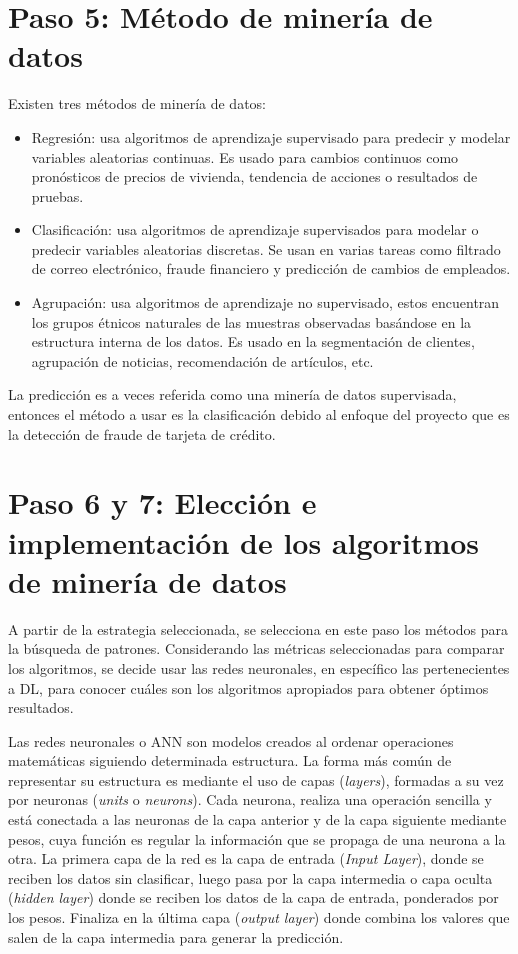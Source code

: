 \section{Paso 5: M\'{e}todo de miner\'{i}a de datos}

  Existen tres m\'{e}todos de miner\'{i}a de datos:
  \begin{itemize}
  	\item Regresi\'{o}n: usa algoritmos de aprendizaje supervisado para predecir y modelar variables aleatorias continuas. Es usado para cambios continuos como pron\'{o}sticos de precios de vivienda, tendencia de acciones o resultados de pruebas.
  	\item Clasificaci\'{o}n: usa algoritmos de aprendizaje supervisados para modelar o predecir variables aleatorias discretas. Se usan en varias tareas como filtrado de correo electr\'{o}nico, fraude financiero y predicci\'{o}n de cambios de empleados.
  	\item Agrupaci\'{o}n: usa algoritmos de aprendizaje no supervisado, estos encuentran los grupos \'{e}tnicos naturales de las muestras observadas bas\'{a}ndose en la estructura interna de los datos. Es usado en la segmentaci\'{o}n de clientes, agrupaci\'{o}n de noticias, recomendaci\'{o}n de art\'{i}culos, etc.
  \end{itemize}

  La predicci\'{o}n es a veces referida como una miner\'{i}a de datos supervisada, entonces el m\'{e}todo a usar es la clasificaci\'{o}n debido al enfoque del proyecto que es la detecci\'{o}n de fraude de tarjeta de cr\'{e}dito.
  
  \section{Paso 6 y 7: Elecci\'{o}n e implementaci\'{o}n de los algoritmos de miner\'{i}a de datos}
  
    A partir de la estrategia seleccionada, se selecciona en este paso los m\'{e}todos para la b\'{u}squeda de patrones. Considerando las m\'{e}tricas seleccionadas para comparar los algoritmos, se decide usar las redes neuronales, en espec\'{i}fico las pertenecientes a DL, para conocer cu\'{a}les son los algoritmos apropiados para obtener \'{o}ptimos resultados.
    
    Las redes neuronales o ANN son modelos creados al ordenar operaciones matem\'{a}ticas siguiendo determinada estructura. La forma m\'{a}s com\'{u}n de representar su estructura es mediante el uso de capas (\textit{layers}), formadas a su vez por neuronas (\textit{units} o \textit{neurons}). Cada neurona, realiza una operaci\'{o}n sencilla y est\'{a} conectada a las neuronas de la capa anterior y de la capa siguiente mediante pesos, cuya funci\'{o}n es regular la informaci\'{o}n que se propaga de una neurona a la otra.  La primera capa de la red es la capa de entrada (\textit{Input Layer}), donde se reciben los datos sin clasificar, luego pasa por la capa intermedia o capa oculta (\textit{hidden layer}) donde se reciben los datos de la capa de entrada, ponderados por los pesos. Finaliza en la \'{u}ltima capa (\textit{output layer}) donde combina los valores que salen de la capa intermedia para generar la predicci\'{o}n.
    
